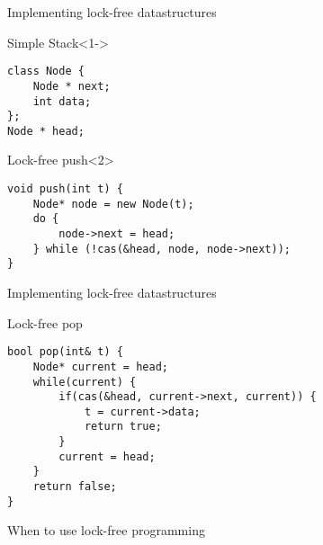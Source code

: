 \begin{frame}[fragile]{Implementing lock-free datastructures}
\begin{block}{Simple Stack}<1->
\begin{lstlisting}[style=customc]
class Node {
    Node * next;
    int data;
};
Node * head;
\end{lstlisting}
\end{block} 

\begin{block}{Lock-free push}<2>
\begin{lstlisting}[style=customc]
void push(int t) {
    Node* node = new Node(t);
    do {
        node->next = head;
    } while (!cas(&head, node, node->next));
}
\end{lstlisting}
\end{block}
\end{frame}

\begin{frame}[fragile]{Implementing lock-free datastructures} 
\begin{block}{Lock-free pop}
\begin{lstlisting}[style=customc]
bool pop(int& t) {
    Node* current = head;
    while(current) {
        if(cas(&head, current->next, current)) {
            t = current->data;
            return true;
        }
        current = head;
    }
    return false;
}
\end{lstlisting}
\end{block}

\end{frame}

\begin{frame}{When to use lock-free programming}

\end{frame}

